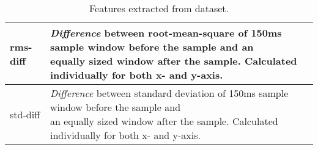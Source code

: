 \begin{table}[h]
{\begin{tabular}{@{}ll@{}}
        \\ \midrule
        rms-diff &
        \makecell{\textit{Difference} between root-mean-square of 150ms sample window before the sample and an\\ equally sized window after the sample. Calculated individually for both x- and y-axis.}
        \\ \midrule
        std-diff &
        \makecell{\textit{Difference} between standard deviation of 150ms sample window before the sample and\\ an equally sized window after the sample. Calculated individually for both x- and y-axis.}
        \\ \bottomrule
        \end{tabular}
    }
    \caption{Features extracted from dataset.}
    \label{tab:meth_FeatureTable}
\end{table}